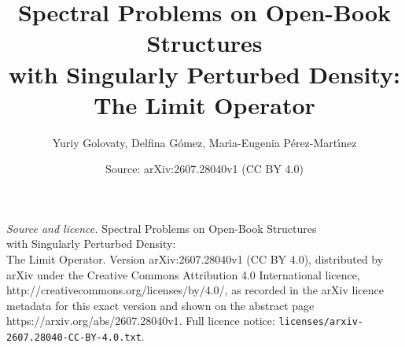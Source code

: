 \documentclass[10pt,a4paper]{amsart}
\title{Spectral Problems on Open-Book Structures\\ with Singularly Perturbed Density:\\ The Limit Operator}
\author{Yuriy Golovaty, Delfina G\'omez, Maria-Eugenia P\'erez-Mart\'{\i}nez}
\date{Source: arXiv:2607.28040v1 (CC BY 4.0)}
\begin{document}
\maketitle

\noindent\emph{Source and licence.} Spectral Problems on Open-Book Structures\\ with Singularly Perturbed Density:\\ The Limit Operator. Version arXiv:2607.28040v1 (CC BY 4.0), distributed by arXiv under the Creative Commons Attribution 4.0 International licence, http://creativecommons.org/licenses/by/4.0/, as recorded in the arXiv licence metadata for this exact version and shown on the abstract page https://arxiv.org/abs/2607.28040v1. Full licence notice: \texttt{licenses/arxiv-2607.28040-CC-BY-4.0.txt}.\par\smallskip
\end{document}
